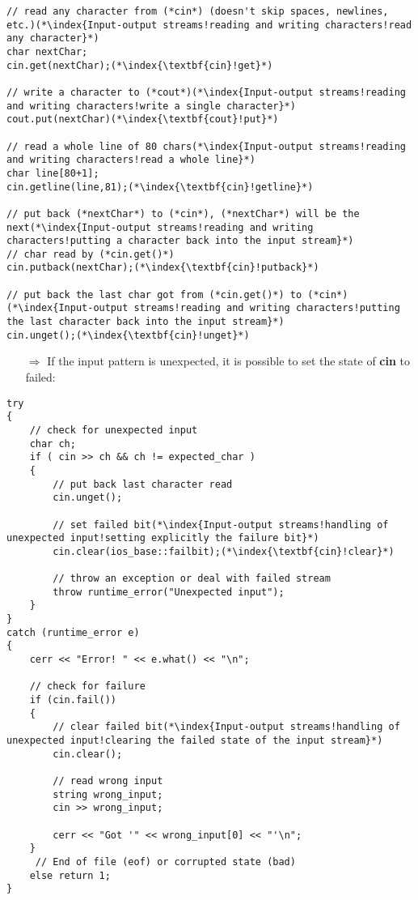 \documentclass[10pt]{article}
\begin{document}
\begin{lstlisting}
// read any character from (*cin*) (doesn't skip spaces, newlines, etc.)(*\index{Input-output streams!reading and writing characters!read any character}*)
char nextChar;
cin.get(nextChar);(*\index{\textbf{cin}!get}*)

// write a character to (*cout*)(*\index{Input-output streams!reading and writing characters!write a single character}*)
cout.put(nextChar)(*\index{\textbf{cout}!put}*)

// read a whole line of 80 chars(*\index{Input-output streams!reading and writing characters!read a whole line}*)
char line[80+1];
cin.getline(line,81);(*\index{\textbf{cin}!getline}*)

// put back (*nextChar*) to (*cin*), (*nextChar*) will be the next(*\index{Input-output streams!reading and writing characters!putting a character back into the input stream}*)
// char read by (*cin.get()*)
cin.putback(nextChar);(*\index{\textbf{cin}!putback}*)

// put back the last char got from (*cin.get()*) to (*cin*)(*\index{Input-output streams!reading and writing characters!putting the last character back into the input stream}*)
cin.unget();(*\index{\textbf{cin}!unget}*)
\end{lstlisting}
\begin{enumerate}
\item[$\Rightarrow$] If the input pattern is unexpected, it is possible to set the state of \textbf{cin} to failed:
\end{enumerate}
\begin{lstlisting}
try
{
    // check for unexpected input
    char ch;
    if ( cin >> ch && ch != expected_char )
    {
        // put back last character read
        cin.unget();
        
        // set failed bit(*\index{Input-output streams!handling of unexpected input!setting explicitly the failure bit}*)
        cin.clear(ios_base::failbit);(*\index{\textbf{cin}!clear}*)
    
        // throw an exception or deal with failed stream
        throw runtime_error("Unexpected input");
    }
}
catch (runtime_error e)
{
    cerr << "Error! " << e.what() << "\n";
            
    // check for failure
    if (cin.fail())
    {
        // clear failed bit(*\index{Input-output streams!handling of unexpected input!clearing the failed state of the input stream}*)
        cin.clear();
                
        // read wrong input
        string wrong_input;
        cin >> wrong_input;
                    
        cerr << "Got '" << wrong_input[0] << "'\n";
    }
     // End of file (eof) or corrupted state (bad)
    else return 1;
}
\end{lstlisting}
%
%
\end{document}
